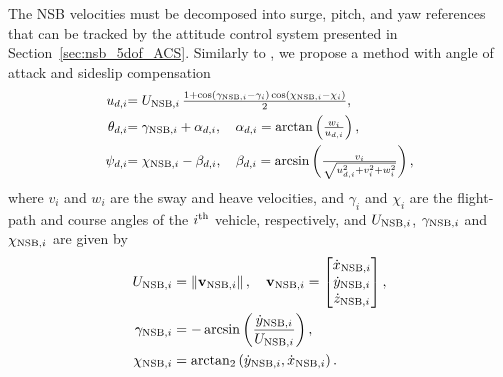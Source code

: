 The NSB velocities must be decomposed into surge, pitch, and yaw references that can be tracked by the attitude control system presented in Section~\ref{sec:nsb_5dof_ACS}.
Similarly to \cite{arrichiello_formation_2006}, we propose a method with angle of attack and sideslip compensation
\begin{align}
    \scale[0.96]{u_{d, i}} & \scale[0.96]{= U_{{\rm NSB}, i}\,\frac{1 + \cos\left(\gamma_{{\rm NSB}, i} - \gamma_i\right)\cos\left(\chi_{{\rm NSB}, i} - \chi_i\right)}{2},} \label{eq:nsb_5dof_u_d}\\
    \scale[0.96]{\theta_{d, i}} & \scale[0.96]{= \gamma_{{\rm NSB}, i} + \alpha_{d, i}, \quad \alpha_{d, i} = \arctan\left(\frac{w_i}{u_{d, i}}\right),} \label{eq:nsb_5dof_theta_d} \\
    \scale[0.96]{\psi_{d, i}} & \scale[0.96]{= \chi_{{\rm NSB}, i} - \beta_{d, i}, \quad \beta_{d, i} = \arcsin\left(\frac{v_i}{\sqrt{u_{d, i}^2 + v_i^2 + w_i^2}}\right), } \label{eq:nsb_5dof_psi_d}
\end{align}
where $v_i$ and $w_i$ are the sway and heave velocities, and $\gamma_i$ and $\chi_i$ are the flight-path and course angles of the $i^{\rm th}$ vehicle, respectively, and $U_{{\rm NSB},i}$, $\gamma_{{\rm NSB},i}$ and $\chi_{{\rm NSB},i}$ are given by
\begin{subequations}
    \begin{align}
        U_{{\rm NSB}, i} &= \left\|\mathbf{v}_{{\rm NSB}, i}\right\|, \quad
        \mathbf{v}_{{\rm NSB}, i} = \begin{bmatrix} \dot{x}_{{\rm NSB}, i} \\ \dot{y}_{{\rm NSB}, i} \\ \dot{z}_{{\rm NSB}, i}\end{bmatrix}, \\*
        \gamma_{{\rm NSB}, i} &= - \arcsin\left(\frac{\dot{y}_{{\rm NSB}, i}}{U_{{\rm NSB}, i}}\right), \\
        \chi_{{\rm NSB}, i} &= \mathrm{arctan}_2 \left(\dot{y}_{{\rm NSB}, i}, \dot{x}_{{\rm NSB}, i}\right).
    \end{align}
\end{subequations}

